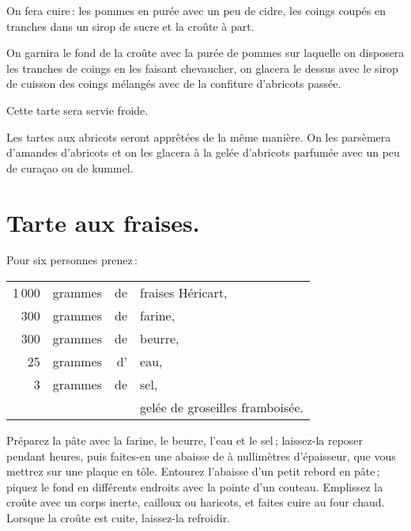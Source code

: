 On fera cuire : les pommes en purée avec un peu de cidre, les coings coupés en
tranches dans un sirop de sucre et la croûte à part.

On garnira le fond de la croûte avec la purée de pommes sur laquelle on
disposera les tranches de coings en les faisant chevaucher, on glacera le
dessus avec le sirop de cuisson des coings mélangés avec de la confiture
d'abricots passée.

Cette tarte sera servie froide.

\sk

Les tartes aux abricots seront apprêtées de la même manière. On les parsèmera
d'amandes d'abricots et on les glacera à la gelée d’abricots parfumée avec un
peu de curaçao ou de kummel.

\section*{\centering Tarte aux fraises.}
{}

Pour six personnes prenez :

\footnotesize
\begin{longtable}{rrrp{16em}}
  1 000 & grammes & de & fraises Héricart,                                                                \\
    300 & grammes & de & farine,                                                                          \\
    300 & grammes & de & beurre,                                                                          \\
     25 & grammes & d' & eau,                                                                             \\
      3 & grammes & de & sel,                                                                             \\
        &         &    & gelée de groseilles framboisée.                                                  \\
\end{longtable}
\normalsize

Préparez la pâte avec la farine, le beurre, l'eau et le sel ; laissez-la
reposer pendant {\mmm} heures, puis faites-en une abaisse de {\mmm}
à {\mmm} nullimètres d'épaisseur, que vous mettrez sur une plaque en tôle.
Entourez l'abaisse d'un petit rebord en pâte ; piquez le fond en différents
endroits avec la pointe d'un couteau. Emplissez la croûte avec un corps inerte,
cailloux ou haricots, et faites cuire au four chaud. Lorsque la croûte est
cuite, laissez-la refroidir.


